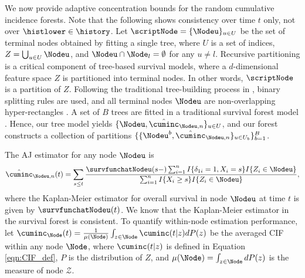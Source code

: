 We now provide adaptive concentration bounds for the random cumulative incidence forests. Note that the following shows consistency over time $t$ only, not over $\histlower \in \history$.
Let $\scriptNode = \{ \Nodeu \}_{u \in U}$ be the set of terminal nodes obtained by fitting a single tree, where $U$ is a set of indices, $Z = \bigcup_{u \in U} \Nodeu$, and $\Nodeu \cap \Node_l = \emptyset$ for any $u \neq l$. Recursive partitioning is a critical component of tree-based survival models, where a $d$-dimensional feature space $Z$ is partitioned into terminal nodes. In other words, $\scriptNode$ is a partition of $Z$. Following the traditional tree-building process in \cite{breiman1984classification}, binary splitting rules are used, and all terminal nodes $\Nodeu$ are non-overlapping hyper-rectangles \citep{wager_adaptive_2016, cui_consistency_2022, cho_multi-stage_2023}. A set of $B$ trees are fitted in a traditional survival forest model \citep{ishwaran_random_2008}. 
Hence, our tree model yields $\{ \Nodeu, \hat{\cuminc}_{\Nodeu,n}\}_{u \in U}$, and our forest constructs a collection of partitions $\{\{ \Nodeu^b, \hat{\cuminc}_{\Nodeu,n} \}_{u \in U_b}\}^B_{b=1}$.

The AJ estimator for any node $\Nodeu$ is
\begin{equation}
\label{eqn:AJhat_node}
\hat{\cuminc}_{\Nodeu,n}(t) = 
\sum_{s \leq t}
\frac{
\survfunchatNodeu(s-)
    \sum_{i=1}^n I{\{ \delta_{1i} = 1, X_i = s  \}}
    I{\{ Z_i \in \Nodeu \}}}{\sum_{i=1}^n I{\{ X_i \geq s \}} I{\{ Z_i \in \Nodeu \}}},
\end{equation} where the Kaplan-Meier estimator for overall survival in node $\Nodeu$ at time $t$ is given by 
$\survfunchatNodeu(t)$.
We know that the Kaplan-Meier estimator in the survival forest is consistent. To quantify within-node estimation performance, let $\cuminc_\Node(t) = \frac{1}{\mu(\Node)} \int_{z\in \Node} \cuminc(t | z) dP(z)$ be the averaged CIF within any node $\Node$, where $\cuminc(t|z)$ is defined in Equation \cref{eqn:CIF_def}, $P$ is the distribution of $Z$, and $\mu(\Node) = \int_{z\in \Node} dP(z)$ is the measure of node $\mathcal{Z}$.


